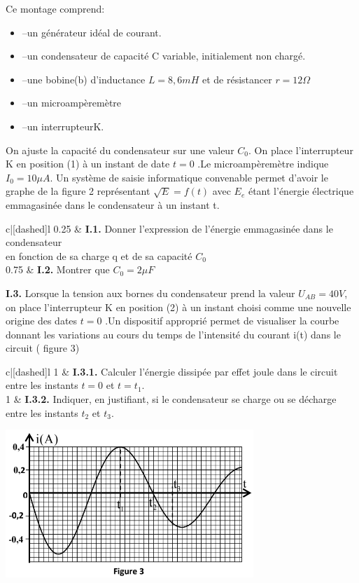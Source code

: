 \documentclass[12pt]{article}
\begin{document}
Ce montage comprend:
\begin{itemize}
	\item --un générateur idéal de courant.
	\item --un condensateur de capacité C variable, initialement non chargé.
	\item --une bobine(b) d’inductance $L =  8,6mH$ et de résistancer $r = 12\Omega$
	\item --un microampèremètre
	\item --un interrupteurK.
\end{itemize}

On ajuste la capacité du condensateur sur une valeur $C_0$. On place l’interrupteur K en position (1) à un instant de date
$t=0$ .Le microampèremètre indique $I_0 = 10\mu A$. Un système de saisie
informatique convenable permet d’avoir le graphe de la figure 2
représentant $\sqrt{E} = f(t)$ avec $E_e$ étant l’énergie électrique emmagasinée dans le condensateur à un instant t.

\begin{tblr}{c|[dashed]l}
0.25  & {\textbf{I.1. }Donner l’expression de l’énergie emmagasinée dans le condensateur \\en fonction de sa charge q et de sa capacité $C_0$} \\

0.75  & \textbf{I.2. }Montrer que $C_0= 2\mu F$\\
\end{tblr}

\textbf{I.3. }Lorsque la tension aux bornes du condensateur prend la valeur $U_{AB} = 40V$, on place l’interrupteur K en
position (2) à un instant choisi comme une nouvelle origine des dates $t =  0$
.Un dispositif approprié permet de
visualiser la courbe donnant les variations au cours du temps de l’intensité du courant
i(t) dans le circuit ( figure 3)

\begin{tblr}{c|[dashed]l}
1  & {\textbf{I.3.1. }Calculer l’énergie dissipée par effet joule dans le circuit entre les instants $t = 0$ et $t = t_1$. } \\

1  & {\textbf{I.3.2. }Indiquer, en justifiant, si le condensateur se charge ou se décharge entre les instants $t_2$ et $t_3$. }\\
\end{tblr}

\begin{center}

\includegraphics[width=0.5\linewidth]{./img/phys04.png} 

\end{center}
\end{document}
